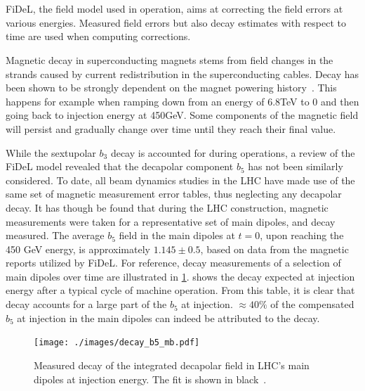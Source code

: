 \section{}
\label{section:decapoles:decay}

FiDeL, the field model used in operation, aims at correcting the field errors at various energies.
Measured field errors but also decay estimates with respect to time are used when computing
corrections.

Magnetic decay in superconducting magnets stems from field changes in the strands caused by current
redistribution in the superconducting cables. Decay has been shown to be strongly dependent on the
magnet powering history~\cite{sammut_mathematical_2006,haverkamp_studies_1999}.
This happens for example when ramping down from an energy of 6.8TeV to 0 and then going back to
injection energy at 450GeV. Some components of the magnetic field will persist and gradually change
over time until they reach their final value.

While the sextupolar $b_3$ decay is accounted for during operations, a review of the FiDeL model
revealed that the decapolar component $b_5$ has not been similarly considered. To date, all beam
dynamics studies in the LHC have made use of the same set of magnetic measurement error tables, thus
neglecting any decapolar decay. It has though be found that during the LHC construction, magnetic
measurements were taken for a representative set of main dipoles, and decay measured.
%
The average $b_5$ field in the main dipoles at $t=0$, upon reaching the 450 GeV energy, is
approximately $1.145 \pm 0.5$, based on data from the magnetic reports utilized by FiDeL. For
reference, decay measurements of a selection of main dipoles over time are illustrated in
\cref{fig:decapoles:decay:decay_b5}.
%
 shows the decay expected at injection energy after a typical
cycle of machine operation. From this table, it is clear that decay accounts for a large part of the
$b_5$ at injection. $\approx 40\%$ of the compensated $b_5$ at injection in the main dipoles can
indeed be attributed to the decay.

\begin{figure}[!htb]
    \centering
    \texttt{[image: ./images/decay\_b5\_mb.pdf]}
    \caption{Measured decay of the integrated decapolar field in LHC's main dipoles at injection
    energy. The fit is shown in black~\cite{deniau_magnetic_2009}.}
    \label{fig:decapoles:decay:decay_b5}
\end{figure}

